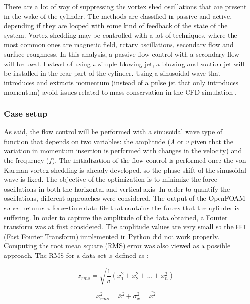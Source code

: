 \newpage

There are a lot of way of suppressing the vortex shed oscillations that are present in the wake of the cylinder. The methods are classified in passive and active, depending if they are looped with some kind of feedback of the state of the system. Vortex shedding may be controlled with a lot of techniques, where the most common ones are magnetic field, rotary oscillations, secondary flow and surface roughness. In this analysis, a passive flow control with a secondary flow will be used. Instead of using a simple blowing jet, a blowing and suction jet will be installed in the rear part of the cylinder. Using a sinusoidal wave that introduces and extracts momentum (instead of a pulse jet that only introduces momentum) avoid issues related to mass conservation in the CFD simulation \cite{rashidi2016vortex}.

\subsubsection*{Case setup}

As said, the flow control will be performed with a sinusoidal wave type of function that depends on two variables: the amplitude ($A$ or $v$ given that the variation in momentum insertion is performed with changes in the velocity) and the frequency ($f$). The initialization of the flow control is performed once the von Karman vortex shedding is already developed, so the phase shift of the sinusoidal wave is fixed. The objective of the optimization is to minimize the force oscillations in both the horizontal and vertical axis. In order to quantify the oscillations, different approaches were considered. The output of the OpenFOAM solver returns a force-time data file that contains the forces that the cylinder is suffering. In order to capture the amplitude of the data obtained, a Fourier transform was at first considered. The amplitude values are very small so the \texttt{FFT} (Fast Fourier Transform) implemented in Python did not work properly. Computing the root mean square (RMS) error was also viewed as a possible approach. The RMS for a data set is defined as \cite{bissell1992digital}:

\begin{equation}
    x_{rms}=\sqrt{\dfrac{1}{n}\left( x_1^2 + x_2^2 + ... + x_n^2 \right)}
\end{equation}

\begin{equation}
    x_{rms}^2=\overline{x}^2+\sigma_x^2=\overline{x^2}
\end{equation} 

